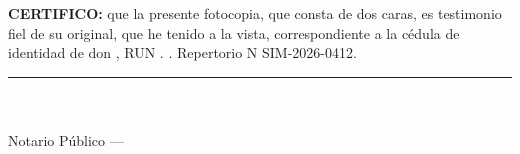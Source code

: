 \documentclass[11pt]{article}
\begin{document}
\vspace{4pt}
{\SIMserif\small
\textbf{CERTIFICO:} que la presente fotocopia, que consta de dos caras, es testimonio fiel de su original, que he tenido a la vista, correspondiente a la cédula de identidad de don \LFXrepresentante, RUN \SIMrunrepresentante. \SIMfecha. Repertorio N\textdegree{} SIM-2026-0412.\par}

\vspace{6pt}
\noindent\begin{minipage}[b]{0.4\linewidth}\end{minipage}\hfill
\begin{minipage}[b]{0.5\linewidth}\centering\rule{6cm}{0.5pt}\\\SIMnotarioTitular\\Notario Público --- \SIMnotaria\\{\small\SIMnotariaDir}\end{minipage}

\end{document}
